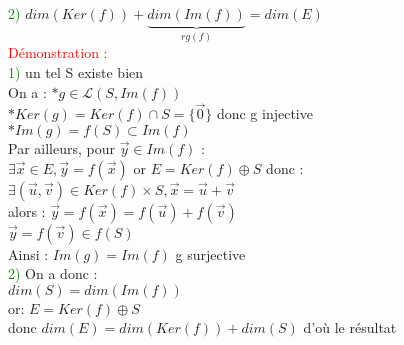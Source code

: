 \documentclass{article}
\begin{document}
\textcolor{green}{2)} $dim(Ker(f))+\underbrace{dim(Im(f))}_{rg(f)} =dim(E)$ \\
\textcolor{red}{Démonstration :} \\
\textcolor{green}{1)} un tel S existe bien \\
On a : $\ast g \in \mathcal L (S,Im(f))$ \\
$\ast Ker(g)=Ker(f) \cap S =\lbrace \vec 0 \rbrace$ donc g injective \\
$\ast Im(g)=f(S) \subset Im(f)$ \\
Par ailleurs, pour $\vec y \in Im(f)$ : \\
$\exists \vec x \in E, \vec y=f(\vec x)$ or $E=Ker(f) \oplus S$ donc : \\
$\exists (\vec u, \vec v) \in Ker(f) \times S, \vec x =\vec u + \vec v$ \\
alors : $\vec y= f(\vec x)= f(\vec u)+ f(\vec v)$ \\
$\vec y = f(\vec v) \in f(S)$ \\
Ainsi : $Im(g)=Im(f)$ g surjective \\
\textcolor{green}{2)} On a donc : \\
$dim(S)=dim(Im(f))$ \\
or: $E=Ker(f) \oplus S$ \\
donc $dim(E)=dim(Ker(f))+dim(S)$ d'où le résultat
\end{document}
